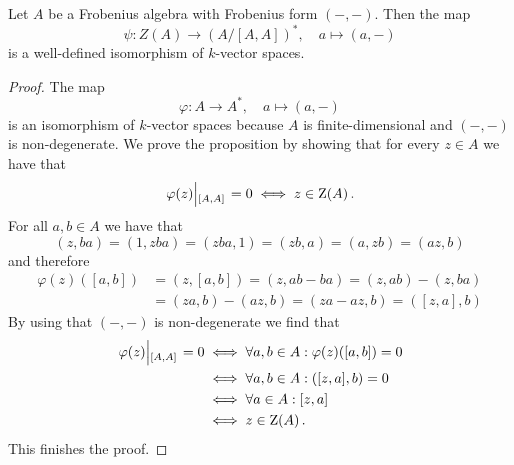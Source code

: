 \begin{proposition}
  Let $A$ be a Frobenius algebra with Frobenius form $(-,-)$.
  Then the map
  \[
            \psi
    \colon  Z(A)
    \to     (A/[A,A])^*,
    \quad   a
    \mapsto (a,-)
  \]
  is a well-defined isomorphism of $k$-vector spaces.
\end{proposition}


\begin{proof}
  The map
  \[
            \varphi
    \colon  A
    \to     A^*,
    \quad   a
    \mapsto (a, -)
  \]
  is an isomorphism of $k$-vector spaces because $A$ is finite-dimensional and $(-,-)$ is non-degenerate.
  We prove the proposition by showing that for every $z \in A$ we have that
  \[
          \restrict*{\varphi(z)}{[A,A]} = 0
    \iff  z \in \ringcenter(A) \,.
  \]
  For all $a, b \in A$ we have that
  \[
      (z,ba)
    = (1,zba)
    = (zba,1)
    = (zb,a)
    = (a,zb)
    = (az,b)
  \]
  and therefore
  \begin{align*}
        \varphi(z)([a,b])
    &=  (z,[a,b])
     =  (z,ab-ba)
     =  (z,ab) - (z,ba) \\
    &=  (za,b) - (az,b)
     =  (za-az,b)
     =  ([z,a],b)
  \end{align*}
  By using that $(-,-)$ is non-degenerate we find that
  \begin{align*}
          \restrict*{\varphi(z)}{[A,A]} = 0
    &\iff \forall a,b \in A: \varphi(z)([a,b]) = 0 \\
    &\iff \forall a,b \in A: ([z,a],b) = 0  \\
    &\iff \forall a \in A:   [z,a]  \\
    &\iff z \in \ringcenter(A) \,.
  \end{align*}
  This finishes the proof.
\end{proof}






